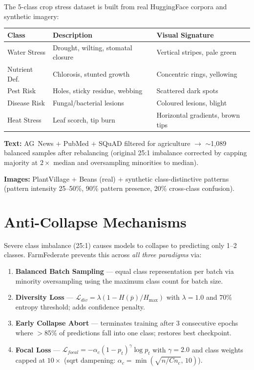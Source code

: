 \documentclass[11pt,a4paper]{article}
\begin{document}
The 5-class crop stress dataset is built from real HuggingFace corpora and synthetic imagery:

\begin{center}
\renewcommand{\arraystretch}{1.3}
\begin{tabularx}{\linewidth}{lXl}
\toprule
\textbf{Class} & \textbf{Description} & \textbf{Visual Signature} \\
\midrule
Water Stress    & Drought, wilting, stomatal closure      & Vertical stripes, pale green \\
Nutrient Def.   & Chlorosis, stunted growth               & Concentric rings, yellowing \\
Pest Risk       & Holes, sticky residue, webbing          & Scattered dark spots \\
Disease Risk    & Fungal/bacterial lesions                & Coloured lesions, blight \\
Heat Stress     & Leaf scorch, tip burn                   & Horizontal gradients, brown tips \\
\bottomrule
\end{tabularx}
\end{center}

\noindent\textbf{Text:} AG~News $+$ PubMed $+$ SQuAD filtered for agriculture
$\to$ $\sim$1,089 balanced samples after rebalancing (original 25:1 imbalance corrected
by capping majority at $2\times$ median and oversampling minorities to median).

\noindent\textbf{Images:} PlantVillage $+$ Beans (real) $+$ synthetic class-distinctive
patterns (pattern intensity 25--50\%, 90\% pattern presence, 20\% cross-class confusion).

\section{Anti-Collapse Mechanisms}

Severe class imbalance (25:1) causes models to collapse to predicting only 1--2 classes.
FarmFederate prevents this across \emph{all three paradigms} via:

\begin{enumerate}[leftmargin=1.5em, itemsep=3pt]
  \item \textbf{Balanced Batch Sampling} --- equal class representation per batch via
        minority oversampling using the maximum class count for batch size.
  \item \textbf{Diversity Loss} ---
        $\mathcal{L}_{div} = \lambda\!\left(1 - H(\bar{p})/H_{\max}\right)$
        with $\lambda{=}1.0$ and 70\% entropy threshold; adds confidence penalty.
  \item \textbf{Early Collapse Abort} --- terminates training after 3 consecutive
        epochs where $>$85\% of predictions fall into one class; restores best checkpoint.
  \item \textbf{Focal Loss} --- $\mathcal{L}_{focal} = -\alpha_c(1-p_t)^\gamma\log p_t$
        with $\gamma{=}2.0$ and class weights capped at $10\times$
        (sqrt dampening: $\alpha_c = \min(\sqrt{n/Cn_c},\,10)$).
\end{enumerate}
\end{document}
